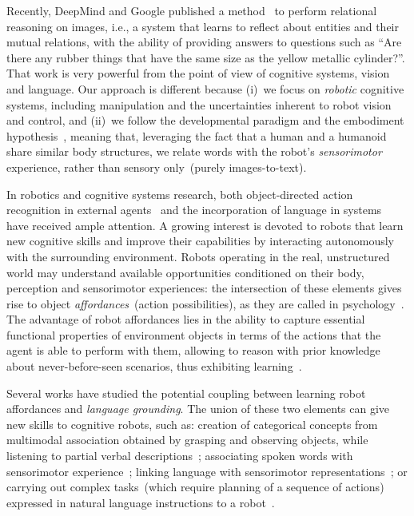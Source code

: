 Recently, DeepMind and Google published a method~\cite{santoro:2017:relational_reasoning} to perform relational reasoning on images, i.e., a system that learns to reflect about entities and their mutual relations, with the ability of providing answers to questions such as ``Are there any rubber things that have the same size as the yellow metallic cylinder?''.
That work is very powerful from the point of view of cognitive systems, vision and language.
Our approach is different because (i)~we focus on \emph{robotic} cognitive systems, including manipulation and the uncertainties inherent to robot vision and control, and (ii)~we follow the developmental paradigm and the embodiment hypothesis~\cite{lungarella:2003:devrobsurvey}, meaning that, leveraging the fact that a human and a humanoid share similar body structures, we relate words with the robot's \emph{sensorimotor} experience, rather than sensory only~(purely images-to-text).

In robotics and cognitive systems research, both object-directed action recognition in external agents~\cite{koppula:2013:ijrr} and the incorporation of language in \hr{} systems~\cite{harnad:1990,matuszek:2014:aaai} have received ample attention.
A growing interest is devoted to robots that learn new cognitive skills and improve their capabilities by interacting autonomously with the surrounding environment.
Robots operating in the real, unstructured world may understand available opportunities conditioned on their body, perception and sensorimotor experiences: the intersection of these elements gives rise to object \emph{affordances}~(action possibilities), as they are called in psychology~\cite{gibson:2014}.
The advantage of robot affordances lies in the ability to capture essential functional properties of environment objects in terms of the actions that the agent is able to perform with them, allowing to reason with prior knowledge about never-before-seen scenarios, thus exhibiting learning~\cite{montesano:2008,jamone:2016:tcds}.

Several works have studied the potential coupling between learning robot affordances and \emph{language grounding}.
The union of these two elements can give new skills to cognitive robots, such as:
creation of categorical concepts from multimodal association obtained by grasping and observing objects, while listening to partial verbal descriptions~\cite{nakamura:2009:iros,araki:2012:iros};
associating spoken words with sensorimotor experience~\cite{salvi:2012:smcb,morse:2016:cogsci};
linking language with sensorimotor representations~\cite{stramandinoli:2016:icdl}; or
carrying out complex tasks~(which require planning of a sequence of actions) expressed in natural language instructions to a robot~\cite{antunes:2016:icra}.

